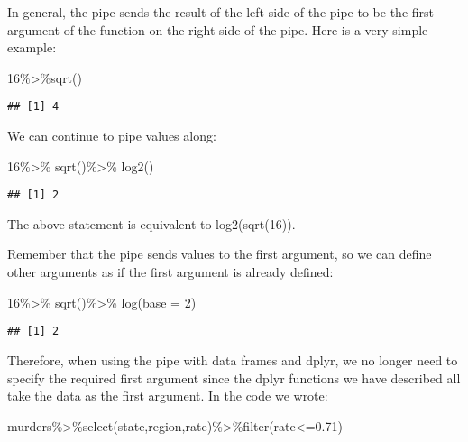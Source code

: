 \documentclass[
]{article}
\newenvironment{Shaded}{\begin{snugshade}}{\end{snugshade}}
\newcommand{\AttributeTok}[1]{\textcolor[rgb]{0.77,0.63,0.00}{#1}}
\newcommand{\DecValTok}[1]{\textcolor[rgb]{0.00,0.00,0.81}{#1}}
\newcommand{\FloatTok}[1]{\textcolor[rgb]{0.00,0.00,0.81}{#1}}
\newcommand{\FunctionTok}[1]{\textcolor[rgb]{0.00,0.00,0.00}{#1}}
\newcommand{\NormalTok}[1]{#1}
\newcommand{\SpecialCharTok}[1]{\textcolor[rgb]{0.00,0.00,0.00}{#1}}
\begin{document}
In general, the pipe sends the result of the left side of the pipe to be
the first argument of the function on the right side of the pipe. Here
is a very simple example:

\begin{Shaded}
\begin{Highlighting}[]
\DecValTok{16}\SpecialCharTok{\%\textgreater{}\%}\FunctionTok{sqrt}\NormalTok{()}
\end{Highlighting}
\end{Shaded}

\begin{verbatim}
## [1] 4
\end{verbatim}

We can continue to pipe values along:

\begin{Shaded}
\begin{Highlighting}[]
\DecValTok{16}\SpecialCharTok{\%\textgreater{}\%} \FunctionTok{sqrt}\NormalTok{()}\SpecialCharTok{\%\textgreater{}\%} \FunctionTok{log2}\NormalTok{()}
\end{Highlighting}
\end{Shaded}

\begin{verbatim}
## [1] 2
\end{verbatim}

The above statement is equivalent to log2(sqrt(16)).

Remember that the pipe sends values to the first argument, so we can
define other arguments as if the first argument is already defined:

\begin{Shaded}
\begin{Highlighting}[]
\DecValTok{16}\SpecialCharTok{\%\textgreater{}\%} \FunctionTok{sqrt}\NormalTok{()}\SpecialCharTok{\%\textgreater{}\%} \FunctionTok{log}\NormalTok{(}\AttributeTok{base =} \DecValTok{2}\NormalTok{)}
\end{Highlighting}
\end{Shaded}

\begin{verbatim}
## [1] 2
\end{verbatim}

Therefore, when using the pipe with data frames and dplyr, we no longer
need to specify the required first argument since the dplyr functions we
have described all take the data as the first argument. In the code we
wrote:

\begin{Shaded}
\begin{Highlighting}[]
\NormalTok{murders}\SpecialCharTok{\%\textgreater{}\%}\FunctionTok{select}\NormalTok{(state,region,rate)}\SpecialCharTok{\%\textgreater{}\%}\FunctionTok{filter}\NormalTok{(rate}\SpecialCharTok{\textless{}=}\FloatTok{0.71}\NormalTok{)}
\end{Highlighting}
\end{Shaded}
\end{document}
